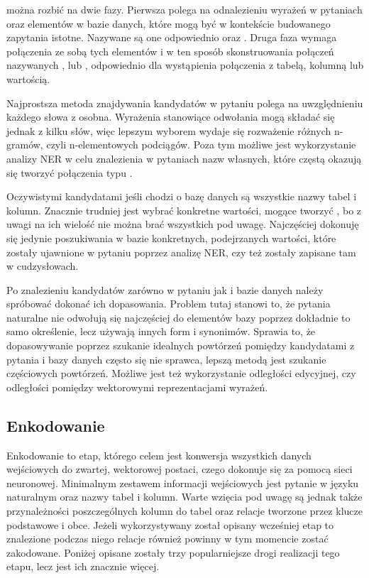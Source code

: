  można rozbić na dwie fazy. Pierwsza polega na odnalezieniu wyrażeń w pytaniach oraz elementów w bazie danych, które mogą być w kontekście budowanego zapytania istotne. Nazywane są one odpowiednio  oraz . Druga faza  wymaga połączenia ze sobą tych elementów i w ten sposób skonstruowania połączeń nazywanych ,  lub , odpowiednio dla wystąpienia połączenia z tabelą, kolumną lub wartością.


Najprostsza metoda znajdywania kandydatów w pytaniu polega na uwzględnieniu każdego słowa z osobna. Wyrażenia stanowiące odwołania mogą składać się jednak z kilku słów, więc lepszym wyborem wydaje się rozważenie różnych n-gramów, czyli n-elementowych podciągów. Poza tym możliwe jest wykorzystanie analizy NER w celu znalezienia w pytaniach nazw własnych, które częstą okazują się tworzyć połączenia typu .

Oczywistymi kandydatami jeśli chodzi o bazę danych są wszystkie nazwy tabel i kolumn. Znacznie trudniej jest wybrać konkretne wartości, mogące tworzyć , bo z uwagi na ich wielość nie można brać wszystkich pod uwagę. Najczęściej dokonuję się jedynie poszukiwania w bazie konkretnych, podejrzanych wartości, które zostały ujawnione w pytaniu poprzez analizę NER, czy też zostały zapisane tam w cudzysłowach.

Po znalezieniu kandydatów zarówno w pytaniu jak i bazie danych należy spróbować dokonać ich dopasowania. Problem tutaj stanowi to, że pytania naturalne nie odwołują się najczęściej do elementów bazy poprzez dokładnie to samo określenie, lecz używają innych form i synonimów. Sprawia to, że dopasowywanie poprzez szukanie idealnych powtórzeń pomiędzy kandydatami z pytania i bazy danych często się nie sprawca, lepszą metodą jest szukanie częściowych powtórzeń. Możliwe jest też wykorzystanie odległości edycyjnej, czy odległości pomiędzy wektorowymi reprezentacjami wyrażeń.

\subsection{Enkodowanie}
Enkodowanie to etap, którego celem jest konwersja wszystkich danych wejściowych do zwartej, wektorowej postaci, czego dokonuje się za pomocą sieci neuronowej. Minimalnym zestawem informacji wejściowych jest pytanie w języku naturalnym oraz nazwy tabel i kolumn. Warte wzięcia pod uwagę są jednak także przynależności poszczególnych kolumn do tabel oraz relacje tworzone przez klucze podstawowe i obce. Jeżeli wykorzystywany został opisany wcześniej etap  to znalezione podczas niego relacje również powinny w tym momencie zostać zakodowane. Poniżej opisane zostały trzy popularniejsze drogi realizacji tego etapu, lecz jest ich znacznie więcej.

